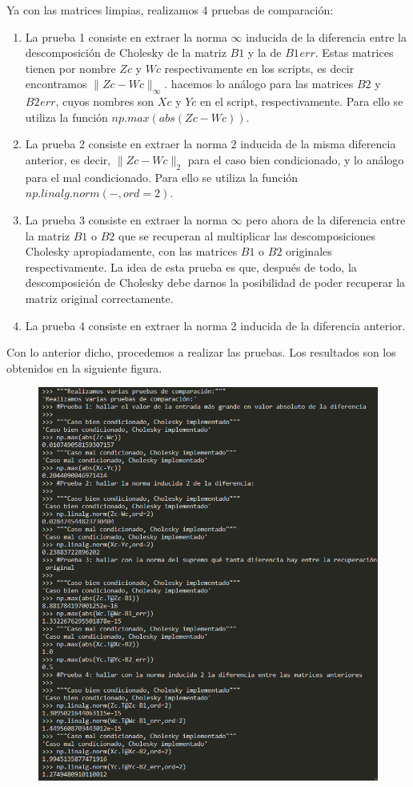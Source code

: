 \documentclass[letterpaper]{article}
\newcommand{\1}{\mathds{1}}
\theoremstyle{definition}
\theoremstyle{definition}
\theoremstyle{definition}
\theoremstyle{definition}
\theoremstyle{definition}
\begin{document}
\begin{enumerate}
\begin{enumerate}
        Ya con las matrices limpias, realizamos 4 pruebas de comparación:
        \begin{enumerate}
            \item La prueba 1 consiste en extraer la norma $\infty$ inducida de la diferencia entre la descomposición de Cholesky de la matriz $B1$ y la de $B1_{}err$.
            Estas matrices tienen por nombre $Zc$ y $Wc$ respectivamente en los scripts, es decir encontramos $\|Zc-Wc\|_{\infty}$. hacemos
            lo análogo para las matrices $B2$ y $B2_{}err$, cuyos nombres son $Xc$ y $Yc$ en el script, respectivamente. Para ello se utiliza la función $np.max(abs(Zc-Wc))$.
            \item La prueba 2 consiste en extraer la norma $2$ inducida de la misma diferencia anterior, es decir, $\|Zc-Wc\|_{2}$ para el
            caso bien condicionado, y lo análogo para el mal condicionado. Para ello se utiliza la función $np.linalg.norm(-,ord=2)$.
            \item La prueba 3 consiste en extraer la norma $\infty$ pero ahora de la diferencia entre la matriz $B1$ o $B2$ que se recuperan al multiplicar las descomposiciones
            Cholesky apropiadamente, con las matrices $B1$ o $B2$ originales respectivamente. La idea de esta prueba es que, después de todo,
            la descomposición de Cholesky debe darnos la posibilidad de poder recuperar la matriz original correctamente.
            \item La prueba 4 consiste en extraer la norma 2 inducida de la diferencia anterior.
        \end{enumerate}
        Con lo anterior dicho, procedemos a realizar las pruebas. Los resultados son los obtenidos en la siguiente figura.
        \begin{figure}[h]
            \centering
            \includegraphics[width=0.7\linewidth]{3.png}

\end{figure}
\end{enumerate}
\end{enumerate}
\end{document}
